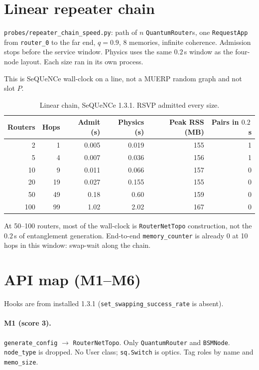 \documentclass[11pt]{article}
\begin{document}
\section{Linear repeater chain}
\label{sec:chain}

\texttt{probes/repeater\_chain\_speed.py}: path of $n$ \texttt{QuantumRouter}s, one \texttt{RequestApp} from \texttt{router\_0} to the far end, $q=0.9$, 8 memories, infinite coherence.
Admission stops before the service window.
Physics uses the same $0.2$\,s window as the four-node layout.
Each size ran in its own process.

This is SeQUeNCe wall-clock on a line, not a MUERP random graph and not slot $P$.

\begin{table}[h]
\centering
\caption{Linear chain, SeQUeNCe 1.3.1. RSVP admitted every size.}
\label{tab:chain}
\begin{tabular}{@{}rrrrrr@{}}
\toprule
Routers & Hops & Admit (s) & Physics (s) & Peak RSS (MB) & Pairs in $0.2$\,s \\
\midrule
2 & 1 & 0.005 & 0.019 & 155 & 1 \\
5 & 4 & 0.007 & 0.036 & 156 & 1 \\
10 & 9 & 0.011 & 0.066 & 157 & 0 \\
20 & 19 & 0.027 & 0.155 & 155 & 0 \\
50 & 49 & 0.18 & 0.60 & 159 & 0 \\
100 & 99 & 1.02 & 2.02 & 167 & 0 \\
\bottomrule
\end{tabular}
\end{table}

At 50--100 routers, most of the wall-clock is \texttt{RouterNetTopo} construction, not the $0.2$\,s of entanglement generation.
End-to-end \texttt{memory\_counter} is already 0 at 10 hops in this window: swap-wait along the chain.

\section{API map (M1--M6)}

Hooks are from installed 1.3.1 (\texttt{set\_swapping\_success\_rate} is absent).

\paragraph{M1 (score 3).}
\texttt{generate\_config} $\to$ \texttt{RouterNetTopo}.
Only \texttt{QuantumRouter} and \texttt{BSMNode}.
\texttt{node\_type} is dropped.
No User class; \texttt{sq.Switch} is optics.
Tag roles by name and \texttt{memo\_size}.
\end{document}
